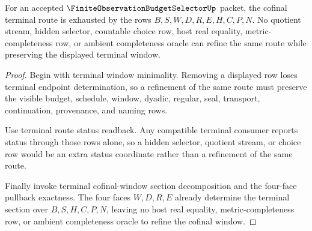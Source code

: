 \begin{theorem}
\label{thm:finite-observation-budget-selector-cofinal-window-exhaustion}
For an accepted $\FiniteObservationBudgetSelectorUp$ packet, the cofinal terminal route is exhausted by the rows $B,S,W,D,R,E,H,C,P,N$. No quotient stream, hidden selector, countable choice row, host real equality, metric-completeness row, or ambient completeness oracle can refine the same route while preserving the displayed terminal window.
\end{theorem}
\begin{proof}
Begin with terminal window minimality. Removing a displayed row loses terminal endpoint determination, so a refinement of the same route must preserve the visible budget, schedule, window, dyadic, regular, seal, transport, continuation, provenance, and naming rows.

Use terminal route status readback. Any compatible terminal consumer reports status through those rows alone, so a hidden selector, quotient stream, or choice row would be an extra status coordinate rather than a refinement of the same route.

Finally invoke terminal cofinal-window section decomposition and the four-face pullback exactness. The four faces $W,D,R,E$ already determine the terminal section over $B,S,H,C,P,N$, leaving no host real equality, metric-completeness row, or ambient completeness oracle to refine the cofinal window.
\end{proof}

